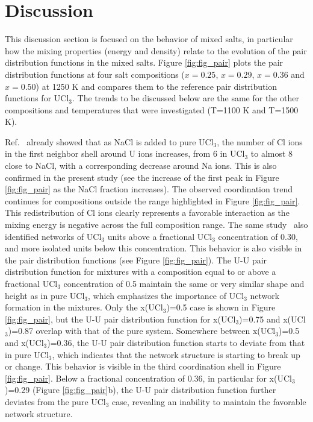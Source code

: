 \documentclass[preprint,3p,10pt,onecolumn,number,sort&compress]{elsarticle}
\begin{document}
{\FloatBarrier

\section{Discussion}
\label{sec:discussion}
This discussion section is focused on the behavior of mixed salts, in particular how the mixing properties (energy and density) relate to the evolution of the pair distribution functions in the mixed salts. Figure \ref{fig:fig_pair} plots the pair distribution functions at four salt compositions ($x=0.25$, $x=0.29$, $x=0.36$ and $x=0.50$) at 1250 K and compares them to the reference pair distribution functions for UCl$_3$. The trends to be discussed below are the same for the other compositions and temperatures that were investigated (T=1100 K and T=1500 K).

Ref.~\cite{Li} already showed that as NaCl is added to pure UCl$_3$, the number of Cl ions in the first neighbor shell around U ions increases, from 6 in UCl$_3$ to almost 8 close to NaCl, with a corresponding decrease around Na ions. This is also confirmed in the present study (see the increase of the first peak in Figure \ref{fig:fig_pair} as the NaCl fraction increases). The observed coordination trend continues for compositions outside the range highlighted in Figure \ref{fig:fig_pair}.
 This redistribution of Cl ions clearly represents a favorable interaction as the mixing energy is negative across the full composition range. The same study~\cite{Li} also identified networks of UCl$_3$ units above a fractional UCl$_3$ concentration of 0.30, and more isolated units below this concentration. This behavior is also visible in the pair distribution functions (see Figure \ref{fig:fig_pair}). The U-U pair distribution function for mixtures with a composition equal to or above a fractional UCl$_3$ concentration of 0.5 maintain the same or very similar shape and height as in pure UCl$_3$, which emphasizes the importance of UCl$_3$ network formation in the mixtures. Only the x(UCl$_3$)=0.5 case is shown in Figure \ref{fig:fig_pair}, but the U-U pair distribution function for x(UCl$_3$)=0.75 and x(UCl$_3$)=0.87 overlap with that of the pure system. Somewhere between x(UCl$_3$)=0.5 and x(UCl$_3$)=0.36, the U-U pair distribution function starts to deviate from that in pure UCl$_3$, which indicates that the network structure is starting to break up or change. This behavior is visible in the third coordination shell in Figure \ref{fig:fig_pair}.
Below a fractional concentration of 0.36, in particular for x(UCl$_3$)=0.29 (Figure \ref{fig:fig_pair}b), the U-U pair distribution function further deviates from the pure UCl$_3$ case, revealing an inability to maintain the favorable network structure. %
}
\end{document}
